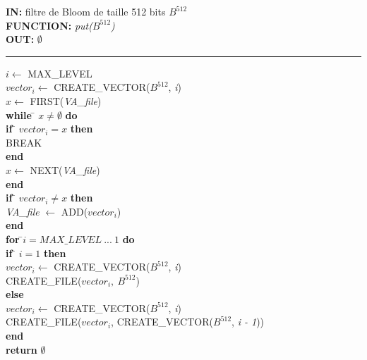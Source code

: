 \begin{flushleft}
	\begin{framed}
		\textbf{IN:} filtre de Bloom de taille 512 bits $B^{512}$\\
		\textbf{FUNCTION:} \textit{put($B^{512}$)}\\
		\textbf{OUT:} \textit{$\emptyset$}\\

		\noindent\rule{\linewidth}{0.5pt}

		\begin{tabbing}
			$i \leftarrow$ MAX\_LEVEL\\
			$vector_i \leftarrow$ CREATE\_VECTOR($B^{512}$, \textit{i})\\
			$x \leftarrow$ FIRST(\textit{VA\_file})\\
			\textbf{while }\= $x \neq \emptyset$ \textbf{do}\\
					\> \textbf{if }\= $vector_i = x$\textbf{ then}\\
					\> \> BREAK\\
					\> \textbf{end}\\
					\> $x \leftarrow$ NEXT(\textit{VA\_file})\\
			\textbf{end}	\\	
			
			\textbf{if }\= $vector_i \neq x$\textbf{ then}\\
				\> \textit{VA\_file } $\leftarrow$ ADD($vector_i$)\\
			\textbf{end}	\\	

			\textbf{for }\=$i = MAX\_LEVEL\ ...\ 1$ \textbf{do}\\
					\> \textbf{if }\= $i = 1$ \textbf{then}\\
					\> 	\> $vector_i \leftarrow$ CREATE\_VECTOR($B^{512}$, \textit{i})\\
					\>	\> CREATE\_FILE($vector_i,\ B^{512}$)\\
					\> \textbf{else}\\
					\>	\> $vector_i \leftarrow$ CREATE\_VECTOR($B^{512}$, \textit{i})\\
					\>	\> CREATE\_FILE($vector_i$, CREATE\_VECTOR($B^{512}$, \textit{i - 1}))\\
			\textbf{end}	\\	
			\textbf{return} $\emptyset$\\
	    	\end{tabbing}		
	\end{framed}
\end{flushleft}

